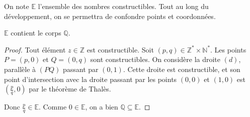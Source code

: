 





  \begin{notation}
    On note $\mathbb{E}$ l'ensemble des nombres constructibles. Tout au long du développement, on se permettra de confondre points et coordonnées.
  \end{notation}


  \begin{lemma}
    \label{theoreme-de-wantzel-1}
    $\mathbb{E}$ contient le corps $\mathbb{Q}$.
  \end{lemma}

  \begin{proof}
    Tout élément $z \in \mathbb{Z}$ est constructible. Soit $(p,q) \in \mathbb{Z}^* \times \mathbb{N}^*$. Les points $P = (p,0)$ et $Q = (0,q)$ sont constructibles. On considère la droite $(d)$, parallèle à $(PQ)$ passant par $(0,1)$. Cette droite est constructible, et son point d'intersection avec la droite passant par les points $(0,0)$ et $(1,0)$ est $\left( \frac{p}{q}, 0 \right)$ par le théorème de Thalès.
    \begin{center}
    \end{center}
    Donc $\frac{p}{q} \in \mathbb{E}$. Comme $0 \in \mathbb{E}$, on a bien $\mathbb{Q} \subseteq \mathbb{E}$.
  \end{proof}

